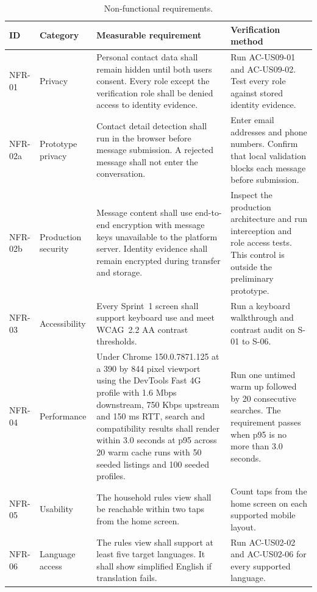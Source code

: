 \documentclass[11pt,a4paper]{article}
\begin{document}
\begin{table}[H]
    \centering
    \small
    \caption{Non-functional requirements.}
    \begin{tabularx}{\textwidth}{@{}L{1.8cm}L{2.2cm}Y L{3.5cm}@{}}
        \toprule
        ID & Category & Measurable requirement & Verification method\\
        \midrule
        NFR-01 & Privacy & Personal contact data shall remain hidden until both users consent. Every role except the verification role shall be denied access to identity evidence. & Run AC-US09-01 and AC-US09-02. Test every role against stored identity evidence.\\
        NFR-02a & Prototype privacy & Contact detail detection shall run in the browser before message submission. A rejected message shall not enter the conversation. & Enter email addresses and phone numbers. Confirm that local validation blocks each message before submission.\\
        NFR-02b & Production security & Message content shall use end-to-end encryption with message keys unavailable to the platform server. Identity evidence shall remain encrypted during transfer and storage. & Inspect the production architecture and run interception and role access tests. This control is outside the preliminary prototype.\\
        NFR-03 & Accessibility & Every Sprint~1 screen shall support keyboard use and meet WCAG~2.2 AA contrast thresholds. & Run a keyboard walkthrough and contrast audit on S-01 to S-06.\\
        NFR-04 & Performance & Under Chrome 150.0.7871.125 at a 390 by 844 pixel viewport using the DevTools Fast 4G profile with 1.6 Mbps downstream, 750 Kbps upstream and 150 ms RTT, search and compatibility results shall render within 3.0 seconds at p95 across 20 warm cache runs with 50 seeded listings and 100 seeded profiles. & Run one untimed warm up followed by 20 consecutive searches. The requirement passes when p95 is no more than 3.0 seconds.\\
        NFR-05 & Usability & The household rules view shall be reachable within two taps from the home screen. & Count taps from the home screen on each supported mobile layout.\\
        NFR-06 & Language access & The rules view shall support at least five target languages. It shall show simplified English if translation fails. & Run AC-US02-02 and AC-US02-06 for every supported language.\\
        \bottomrule
    \end{tabularx}
    \label{tabnonfunctionalrequirements}
\end{table}
\end{document}
